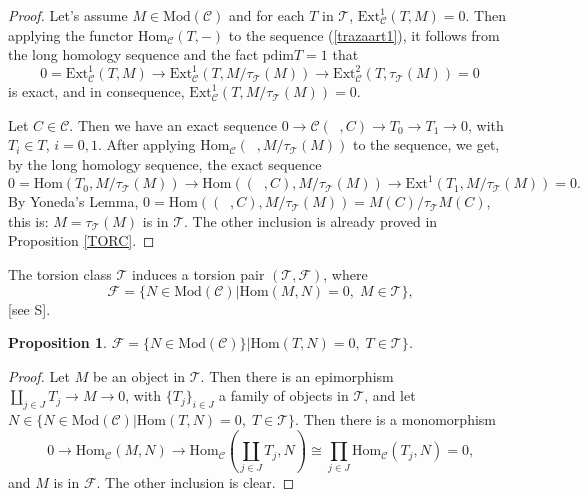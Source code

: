 \documentclass{amsart}
\theoremstyle{plain}
\newtheorem{proposition}{Proposition}
\numberwithin{equation}{section}
\begin{document}
\begin{proof}
Let's assume $M\in \mathrm{\mathrm{Mod}}(\mathcal{C})$ and for each $T$ in $\mathcal{T}$, $\mathrm{Ext}_{\mathcal{C}}^{1}(T,M)=0$. Then applying the
functor $\mathrm{Hom}_{\mathcal{C}}(T,-)$ to the sequence (\ref{trazaart1}),
it follows from the long homology sequence and the fact $\mathrm{pdim}T=1$
that
\begin{equation*}
0=\mathrm{Ext}_{\mathcal{C}}^{1}(T,M)\rightarrow \mathrm{Ext}_{\mathcal{C}}^{1}(T,M/\tau _{\mathcal{T}}(M))\rightarrow \mathrm{Ext}_{\mathcal{C}}^{2}(T,\tau _{\mathcal{T}}(M))=0
\end{equation*}is exact, and in consequence, $\mathrm{Ext}_{\mathcal{C}}^{1}(T,M/\tau _{\mathcal{T}}(M))=0$.

Let $C\in \mathcal{C}$. Then we have an exact sequence $0\rightarrow
\mathcal{C}(\;\;,C)\rightarrow T_{0}\rightarrow T_{1}\rightarrow 0$, with $T_{i}\in T$, $i=0,1$. After applying $\mathrm{Hom}_{\mathcal{C}}(\;\;,M/\tau
_{\mathcal{T}}(M))$ to the sequence, we get, by the long homology sequence,
the exact sequence
\begin{equation*}
0=\mathrm{Hom}(T_{0},M/\tau _{\mathcal{T}}(M))\rightarrow \mathrm{Hom}((\;\;,C),M/\tau _{\mathcal{T}}(M))\rightarrow \mathrm{Ext}^{1}(T_{1},M/\tau
_{\mathcal{T}}(M))=0\text{.}
\end{equation*}By Yoneda's Lemma, $0=\mathrm{Hom}((\;\;,C),M/\tau _{\mathcal{T}}(M))=M(C)/\tau _{\mathcal{T}}M(C)$, this is: $M=\tau _{\mathcal{T}}(M)$ is
in $\mathscr{T}$. The other inclusion is already proved in Proposition \ref{TORC}.
\end{proof}

The torsion class $\mathscr T$ induces a torsion pair $(\mathscr T,\mathscr F)$, where
\begin{equation*}
\mathscr F=\{N\in \mathrm{\mathrm{Mod}}(\mathcal{C})|\mathrm{Hom}(M,N)=0,\;M\in \mathscr T\}\text{,}
\end{equation*}[see S].

\begin{proposition}
$\mathscr{F}=\{N\in\mathrm{\mathrm{Mod}}(\mathcal{C})\}|\mathrm{Hom}(T,N)=0,\; T\in\mathcal{T}\}$.
\end{proposition}

\begin{proof}
Let $M$ be an object in $\mathscr T$. Then there is an epimorphism $\coprod_{j\in J}T_{j}\rightarrow M\rightarrow 0$, with $\{T_{j}\}_{i\in J}$
a family of objects in $\mathcal{T}$, and let $N\in \{N\in \mathrm{\mathrm{Mod}}(\mathcal{C})|\mathrm{Hom}(T,N)=0,\;T\in \mathcal{T}\}$. Then there is
a monomorphism
\begin{equation*}
0\rightarrow \mathrm{Hom}_{\mathcal{C}}(M,N)\rightarrow\mathrm{Hom}_\mathcal{C} (\coprod_{j\in J}T_{j},N)\cong \prod_{j\in J}\mathrm{Hom}_{\mathcal{C}}(T_{j},N)=0\text{,}
\end{equation*}and $M$ is in $\mathscr F$. The other inclusion is clear.
\end{proof}
\end{document}
